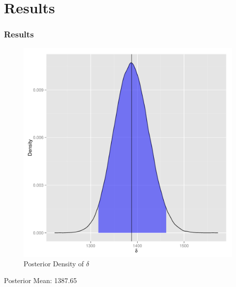 \documentclass[10pt, compress]{beamer}
\begin{document}
  \section{Results}
  \begin{frame}
    \frametitle{Results}
    \centering
    \begin{figure}
      \caption{Posterior Density of $\delta$}
      \includegraphics[height=0.625\textheight]{delta_density.pdf}
    \end{figure}
    Posterior Mean: 1387.65
  \end{frame}
\end{document}
